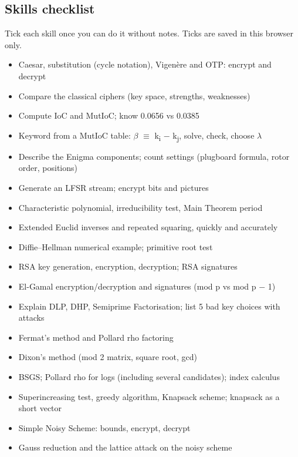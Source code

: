 \documentclass[11pt,a4paper]{article}
\begin{document}
\subsection*{Skills checklist}
{\small\color{black!70} Tick each skill once you can do it without notes. Ticks are saved in this browser only.}\par
\begin{itemize}[label=$\square$]
\item Caesar, substitution (cycle notation), Vigenère and OTP: encrypt and decrypt
\item Compare the classical ciphers (key space, strengths, weaknesses)
\item Compute IoC and MutIoC; know 0.0656 vs 0.0385
\item Keyword from a MutIoC table: \ensuremath{\beta} \ensuremath{\equiv} k\textsubscript{i} \ensuremath{-} k\textsubscript{j}, solve, check, choose \ensuremath{\lambda}
\item Describe the Enigma components; count settings (plugboard formula, rotor order, positions)
\item Generate an LFSR stream; encrypt bits and pictures
\item Characteristic polynomial, irreducibility test, Main Theorem period
\item Extended Euclid inverses and repeated squaring, quickly and accurately
\item Diffie–Hellman numerical example; primitive root test
\item RSA key generation, encryption, decryption; RSA signatures
\item El-Gamal encryption/decryption and signatures (mod p vs mod p \ensuremath{-} 1)
\item Explain DLP, DHP, Semiprime Factorisation; list 5 bad key choices with attacks
\item Fermat's method and Pollard rho factoring
\item Dixon's method (mod 2 matrix, square root, gcd)
\item BSGS; Pollard rho for logs (including several candidates); index calculus
\item Superincreasing test, greedy algorithm, Knapsack scheme; knapsack as a short vector
\item Simple Noisy Scheme: bounds, encrypt, decrypt
\item Gauss reduction and the lattice attack on the noisy scheme
\end{itemize}
\end{document}
